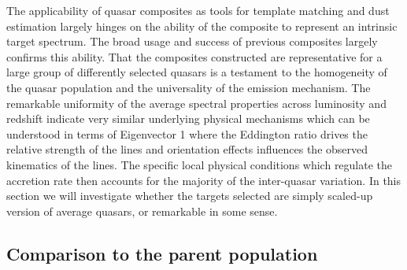 \documentclass{aa}    %
\newcommand{\sectlabel}[1]{\label{sect:#1}}
\newcommand{\todo}[3]{{\color{#2}\emph{#1}: #3}}
\newcommand{\jstodo}[1]{\todo{TODO }{green}{#1}}
\newcommand{\qtodo}[1]{\todo{Question}{red}{#1}}
\begin{document}
The applicability of quasar composites as tools for template matching and dust estimation largely hinges on the ability of the composite to represent an intrinsic target spectrum. The broad usage and success of previous composites largely confirms this ability. That the composites constructed are representative for a large group of differently selected quasars is a testament to the homogeneity of the quasar population and the universality of the emission mechanism.
The remarkable uniformity of the average spectral properties across luminosity and redshift indicate very similar underlying physical mechanisms which can be understood in terms of Eigenvector 1\citep{Boroson1992, Francis1992} where the Eddington ratio drives the relative strength of the lines and orientation effects influences the observed kinematics of the lines\citep{Shen2014a}. The specific local physical conditions which regulate the accretion rate then accounts for the majority of the inter-quasar variation. In this section we will investigate whether the targets selected are simply scaled-up version of average quasars, or remarkable in some sense.


%
%

\subsection{Comparison to the parent population}  \sectlabel{parents}
\end{document}
